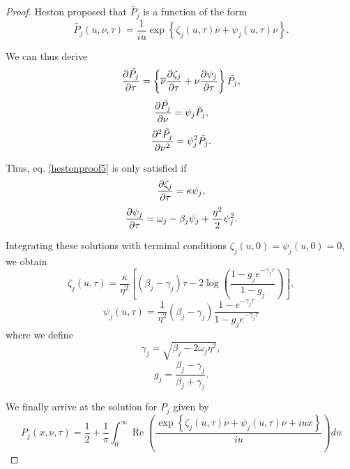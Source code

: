 \begin{proof}
Heston proposed that $\tilde{P_j}$ is a function of the form
\begin{equation}
\tilde{P_j}(u,\nu,\tau)=\frac{1}{iu}\exp\left\{\zeta_j(u,\tau)\overline{\nu}+\psi_j(u,\tau)\nu\right\}.
\end{equation}

We can thus derive
\begin{equation}
\pdv{\tilde{P_j}}{\tau}=\left\{\overline{\nu}\pdv{\zeta_j}{\tau}+\nu\pdv{\psi_j}{\tau}\right\}\tilde{P_j},
\end{equation}
\begin{equation}
\pdv{\tilde{P_j}}{\nu}=\psi_j\tilde{P_j},
\end{equation}
\begin{equation}
\pdv[2]{\tilde{P_j}}{\nu}=\psi_j^2\tilde{P_j}.
\end{equation}

Thus, eq. \eqref{hestonproof5} is only satisfied if
\begin{equation}
\pdv{\zeta_j}{\tau}=\kappa\psi_j,
\end{equation}
\begin{equation}
\pdv{\psi_j}{\tau}=\omega_j-\beta_j\psi_j+\frac{\eta^2}{2}\psi_j^2.
\end{equation}

Integrating these solutions with terminal conditions $\zeta_j(u,0)=\psi_j(u,0)=0$, we obtain
\begin{equation}
\zeta_j(u,\tau)=\frac{\kappa}{\eta^2}\left[\left(\beta_j-\gamma_j\right)\tau-2\log\left(\frac{1-g_je^{-\gamma_j \tau}}{1-g_j}\right)\right],
\end{equation}
\begin{equation}
\psi_j(u,\tau)=\frac{1}{\eta^2}\left(\beta_j-\gamma_j\right)\frac{1-e^{-\gamma_j \tau}}{1-g_je^{-\gamma_j \tau}}
\end{equation}
\noindent where we define
\begin{equation}
\gamma_j=\sqrt{\beta_j-2\omega_j\eta^2},
\end{equation}
\begin{equation}
g_j=\frac{\beta_j-\gamma_j}{\beta_j+\gamma_j}.
\end{equation}

We finally arrive at the solution for $P_j$ given by
\begin{equation}
P_j(x,\nu,\tau)=\frac{1}{2}+\frac{1}{\pi}\int_0^\infty\operatorname{Re}\left(\frac{\exp\left\{\zeta_j(u,\tau)\overline{\nu}+\psi_j(u,\tau)\nu+iux\right\}}{iu}\right)du
\end{equation}


\end{proof}
